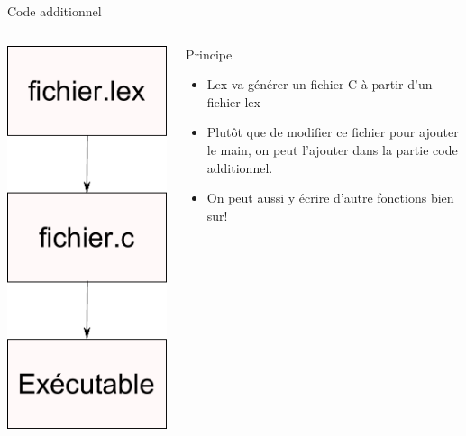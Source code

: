 \def\ftitle{Code additionnel}
\begin{frame}[containsverbatim]{\ftitle}
\def\blocktitle{Principe}

\begin{columns}[c]
\includegraphics[width=.6\textwidth]{images/chaine.pdf}
\begin{block}{\blocktitle}
\begin{itemize}
\item Lex va générer un fichier C à partir d'un fichier lex
\item Plutôt que de modifier ce fichier pour ajouter le main, on peut l'ajouter dans la partie code additionnel.
\item On peut aussi y écrire d'autre fonctions bien sur!
\end{itemize}
\end{block}
\end{columns}
\end{frame}

